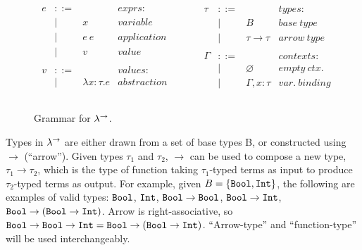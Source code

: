 \begin{figure}[h]
\vspace{-5pt}

\[
\begin{array}{lll}

\begin{array}{lllr}

e & ::= & ~ & exprs: \\
	& | & x & variable \\
	& | & e~e & application \\
	& | & v & value \\
	&&\\
	
v & ::= & ~ & values: \\
	& | & \lambda x: \tau . e & abstraction \\
	&&\\
	
\end{array}

& ~~~~~~ &

\begin{array}{lllr}

\tau & ::= & ~ & types: \\
	& | & B & base~type \\
	& | & \tau \rightarrow \tau & arrow~type \\
	&&\\
	
\Gamma & ::= & ~ & contexts: \\
	& | & \varnothing & empty~ctx. \\
	& | & \Gamma, x: \tau & var.~binding \\
	&&\\
	
\end{array}

\end{array}
\]

\vspace{-12pt}
\caption{Grammar for $\lambda^{\rightarrow}$.}
\label{This is the label.}
\end{figure}

Types in $\lambda^{\rightarrow}$ are either drawn from a set of base types B, or constructed using $\rightarrow$ (``arrow''). Given types $\tau_1$ and $\tau_2$, $\rightarrow$ can be used to compose a new type, $\tau_1 \rightarrow \tau_2$, which is the type of function taking $\tau_1$-typed terms as input to produce $\tau_2$-typed terms as output. For example, given $B = \{ \mathtt{Bool}, \mathtt{Int} \}$, the following are examples of valid types: $\mathtt{Bool}$, $\mathtt{Int}$, $\mathtt{Bool} \rightarrow \mathtt{Bool}$, $\mathtt{Bool} \rightarrow \mathtt{Int}$, $\mathtt{Bool} \rightarrow (\mathtt{Bool} \rightarrow \mathtt{Int})$. Arrow is right-associative, so $\mathtt{Bool} \rightarrow \mathtt{Bool} \rightarrow \mathtt{Int} = \mathtt{Bool} \rightarrow (\mathtt{Bool} \rightarrow \mathtt{Int})$. ``Arrow-type'' and ``function-type'' will be used interchangeably.

